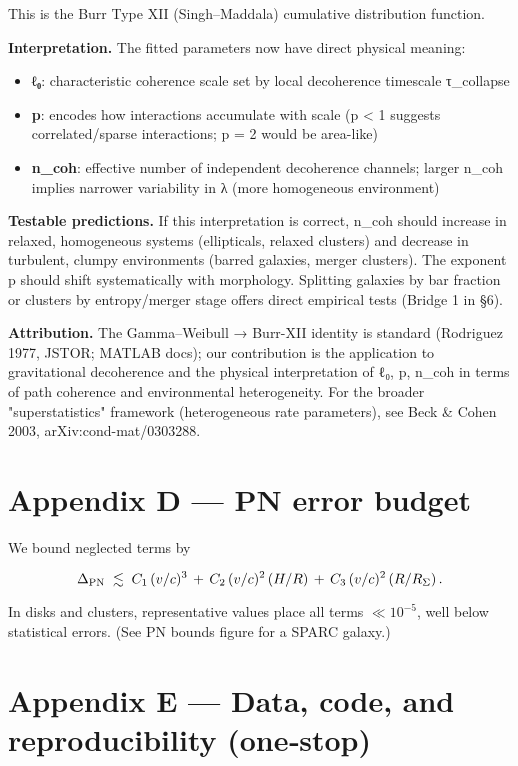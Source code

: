 \documentclass[11pt,a4paper]{article}
\begin{document}
This is the Burr Type XII (Singh–Maddala) cumulative distribution function.


\textbf{Interpretation.} The fitted parameters now have direct physical meaning:  

\begin{itemize}
\item \textbf{ℓ₀}: characteristic coherence scale set by local decoherence timescale τ\_collapse
\item \textbf{p}: encodes how interactions accumulate with scale (p < 1 suggests correlated/sparse interactions; p = 2 would be area-like)
\item \textbf{n\_coh}: effective number of independent decoherence channels; larger n\_coh implies narrower variability in λ (more homogeneous environment)
\end{itemize}


\textbf{Testable predictions.} If this interpretation is correct, n\_coh should increase in relaxed, homogeneous systems (ellipticals, relaxed clusters) and decrease in turbulent, clumpy environments (barred galaxies, merger clusters). The exponent p should shift systematically with morphology. Splitting galaxies by bar fraction or clusters by entropy/merger stage offers direct empirical tests (Bridge 1 in §6).


\textbf{Attribution.} The Gamma–Weibull → Burr-XII identity is standard (Rodriguez 1977, JSTOR; MATLAB docs); our contribution is the application to gravitational decoherence and the physical interpretation of {ℓ₀, p, n\_coh} in terms of path coherence and environmental heterogeneity. For the broader "superstatistics" framework (heterogeneous rate parameters), see Beck \& Cohen 2003, arXiv:cond-mat/0303288.


\section{Appendix D — PN error budget}


We bound neglected terms by


\begin{equation}
\Delta_{\rm PN} \;\lesssim\; C_1\,(v/c)^3 \, + \, C_2\,(v/c)^2\,(H/R) \, + \, C_3\,(v/c)^2\,(R/R_\Sigma)\,.
\end{equation}


In disks and clusters, representative values place all terms $\ll10^{-5}$, well below statistical errors. (See PN bounds figure for a SPARC galaxy.)


\section{Appendix E — Data, code, and reproducibility (one‑stop)}
\end{document}
